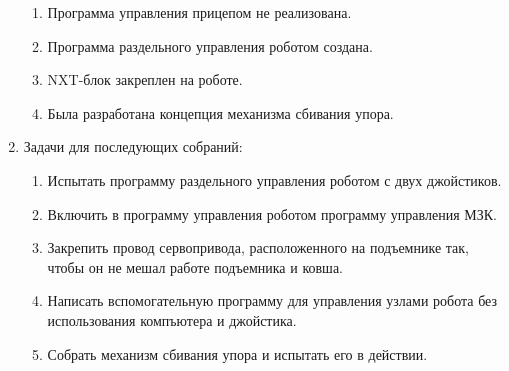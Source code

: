\begin{enumerate}
\begin{enumerate}
		\item Программа управления прицепом не реализована.
		
		\item Программа раздельного управления роботом создана.
		
		\item NXT-блок закреплен на роботе.
		
		\item Была разработана концепция механизма сбивания упора.
		
	\end{enumerate}
	
	\item Задачи для последующих собраний:
	\begin{enumerate}
		\item Испытать программу раздельного управления роботом с двух джойстиков.
		
		\item Включить в программу управления роботом программу управления МЗК.
		
		\item Закрепить провод сервопривода, расположенного на подъемнике так, чтобы он не мешал работе подъемника и ковша.
		
		\item Написать вспомогательную программу для управления узлами робота без использования компъютера и джойстика.
		
		\item Собрать механизм сбивания упора и испытать его в действии.
		
	\end{enumerate}     
\end{enumerate}
\fillpage

